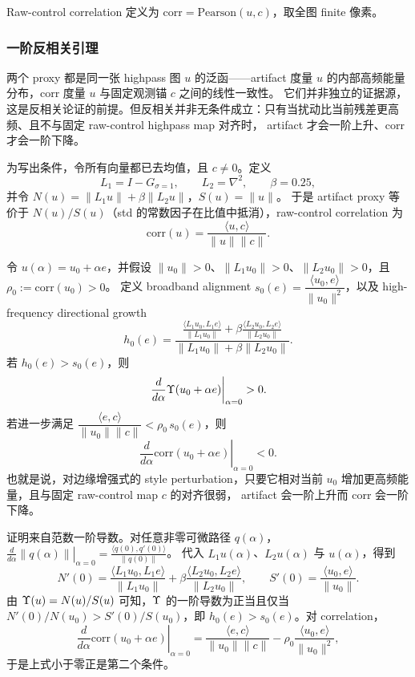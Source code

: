 Raw-control correlation 定义为 \(\mathrm{corr} = \mathrm{Pearson}(u, c)\)，取全图 finite 像素。

\subsubsection{一阶反相关引理}

两个 proxy 都是同一张 highpass 图 \(u\) 的泛函——artifact 度量 \(u\) 的内部高频能量分布，corr 度量 \(u\) 与固定观测锚 \(c\) 之间的线性一致性。
它们并非独立的证据源，这是反相关论证的前提。但反相关并非无条件成立：只有当扰动比当前残差更高频、且不与固定 raw-control highpass map 对齐时，
artifact 才会一阶上升、corr 才会一阶下降。

为写出条件，令所有向量都已去均值，且 \(c\ne0\)。定义
\[
  L_1=I-G_{\sigma=1},\qquad L_2=\nabla^2,\qquad \beta=0.25,
\]
并令 \(N(u)=\|L_1u\|+\beta\|L_2u\|\)，\(S(u)=\|u\|\)。
于是 artifact proxy 等价于 \(N(u)/S(u)\)（std 的常数因子在比值中抵消），raw-control correlation 为
\[
  \mathrm{corr}(u)=\frac{\langle u,c\rangle}{\|u\|\|c\|}.
\]

令 \(u(\alpha)=u_0+\alpha e\)，并假设 \(\|u_0\|>0\)、\(\|L_1u_0\|>0\)、\(\|L_2u_0\|>0\)，且 \(\rho_0:=\mathrm{corr}(u_0)>0\)。
定义 broadband alignment \(s_0(e)=\dfrac{\langle u_0,e\rangle}{\|u_0\|^2}\)，以及 high-frequency directional growth
\[
  h_0(e)=
  \frac{
  \frac{\langle L_1u_0,L_1e\rangle}{\|L_1u_0\|}
  +\beta\frac{\langle L_2u_0,L_2e\rangle}{\|L_2u_0\|}
  }{
  \|L_1u_0\|+\beta\|L_2u_0\|
  }.
\]
若 \(h_0(e)>s_0(e)\)，则
\[
  \left.\frac{d}{d\alpha}\Upsilon(u_0+\alpha e)\right|_{\alpha=0}>0.
\]
若进一步满足 \(\dfrac{\langle e,c\rangle}{\|u_0\|\|c\|}<\rho_0\,s_0(e)\)，则
\[
  \left.\frac{d}{d\alpha}\mathrm{corr}(u_0+\alpha e)\right|_{\alpha=0}<0.
\]
也就是说，对边缘增强式的 style perturbation，只要它相对当前 \(u_0\) 增加更高频能量，且与固定 raw-control map \(c\) 的对齐很弱，
artifact 会一阶上升而 corr 会一阶下降。

证明来自范数一阶导数。对任意非零可微路径 \(q(\alpha)\)，\(\left.\frac{d}{d\alpha}\|q(\alpha)\|\right|_{\alpha=0}=\frac{\langle q(0),q'(0)\rangle}{\|q(0)\|}\)。
代入 \(L_1u(\alpha)\)、\(L_2u(\alpha)\) 与 \(u(\alpha)\)，得到
\[
  N'(0)=
  \frac{\langle L_1u_0,L_1e\rangle}{\|L_1u_0\|}
  +\beta\frac{\langle L_2u_0,L_2e\rangle}{\|L_2u_0\|},
  \qquad
  S'(0)=\frac{\langle u_0,e\rangle}{\|u_0\|}.
\]
由 \(\Upsilon(u)=N(u)/S(u)\) 可知，\(\Upsilon\) 的一阶导数为正当且仅当 \(N'(0)/N(u_0)>S'(0)/S(u_0)\)，即 \(h_0(e)>s_0(e)\)。对 correlation，
\[
  \left.\frac{d}{d\alpha}\mathrm{corr}(u_0+\alpha e)\right|_{\alpha=0}
  =
  \frac{\langle e,c\rangle}{\|u_0\|\|c\|}
  -\rho_0\frac{\langle u_0,e\rangle}{\|u_0\|^2},
\]
于是上式小于零正是第二个条件。

